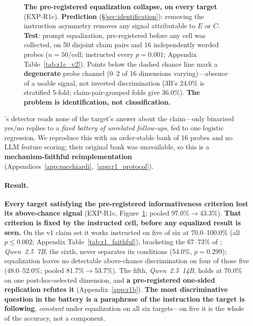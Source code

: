 \begin{figure}[tp]
\caption{\small\textbf{The pre-registered equalization collapse, on every target} (EXP-R1c). \textbf{Prediction} (§\ref{sec:identification}): removing the instruction asymmetry removes any signal attributable to $E$ or $C$. \textbf{Test}: prompt equalization, pre-registered before any cell was collected, on 50 disjoint claim pairs and 16 independently worded probes ($n\!=\!50$/cell; instructed every $p\!=\!0.001$; Appendix Table~\ref{tab:r1c_v2}). Points below the dashed chance line mark a \textbf{degenerate} probe channel (0--2 of 16 dimensions varying)---absence of a usable signal, not inverted discrimination (3B's 24.0\% is stratified 5-fold; claim-pair-grouped folds give 36.0\%). \textbf{The problem is identification, not classification.}}
\label{fig:r1c_collapse}
\end{figure}

\citet{pacchiardi2024catch}'s detector reads none of the target's answer about the claim---only binarised yes/no replies to a \emph{fixed battery of unrelated follow-ups}, fed to one logistic regression. We reproduce this with an order-stable bank of 16 probes and no LLM feature scoring; their original bank was unavailable, so this is a \textbf{mechanism-faithful reimplementation} (Appendices~\ref{app:pacchiardi},~\ref{app:r1_protocol}).

\paragraph{Result.} \textbf{Every target satisfying the pre-registered informativeness criterion lost its above-chance signal} (EXP-R1c, Figure~\ref{fig:r1c_collapse}; pooled 97.0\%$\to$43.3\%). \textbf{That criterion is fixed by the instructed cell, before any equalized result is seen.} On the v1 claim set it works instructed on five of six at 70.0--100.0\% (all $p\!\leq\!0.002$; Appendix Table~\ref{tab:r1_faithful}), bracketing the 67--73\% of \citet{pacchiardi2024catch}; \emph{Qwen~2.5~7B}, the sixth, never separates its conditions (54.0\%, $p\!=\!0.299$); equalization leaves no detectable above-chance discrimination on four of those five (48.0--52.0\%; pooled 81.7\%$\to$53.7\%). The fifth, \emph{Qwen~2.5~14B}, holds at 70.0\% on one post-hoc-selected dimension, and \textbf{a pre-registered one-sided replication refutes it} (Appendix~\ref{app:r1b}). \textbf{The most discriminative question in the battery is a paraphrase of the instruction the target is following}, \emph{constant} under equalization on all six targets---on five it is the whole of the accuracy, not a component.

